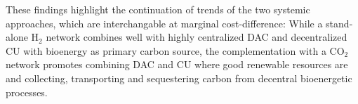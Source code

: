 \documentclass[twocolumn]{article}
\newcommand{\COtwo}{CO$_2$}
\newcommand{\Htwo}{H$_2$}
\newcommand{\modH}{H$_2$\=/Grid model}
\newcommand{\modHybrid}{Hybrid model}
\begin{document}
These findings highlight the continuation of trends of the two systemic approaches, which are interchangable at marginal cost-difference: While a stand-alone \Htwo{} network combines well with highly centralized DAC and decentralized CU with bioenergy as primary carbon source, the complementation with a \COtwo{} network promotes combining DAC and CU where good renewable resources are and collecting, transporting and sequestering carbon from decentral bioenergetic processes.



\end{document}
